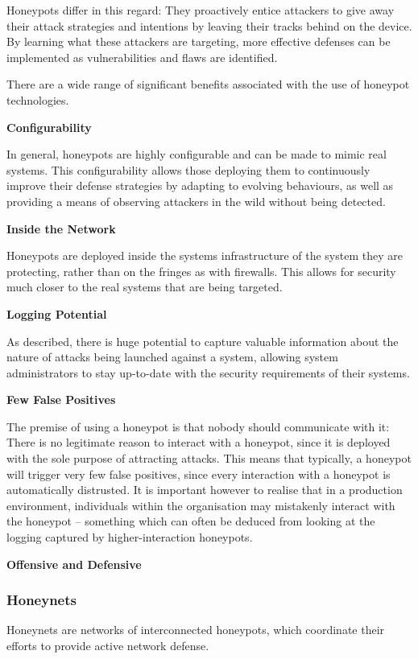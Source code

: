 Honeypots differ in this regard: They proactively entice attackers to give away their attack strategies and intentions by leaving their tracks behind on the device. By learning what these attackers are targeting, more effective defenses can be implemented as vulnerabilities and flaws are identified.

There are a wide range of significant benefits associated with the use of honeypot technologies. 

\bullet \textbf{Configurability}

In general, honeypots are highly configurable and can be made to mimic real systems. This configurability allows those deploying them to continuously improve their defense strategies by adapting to evolving behaviours, as well as providing a means of observing attackers in the wild without being detected.

\bullet \textbf{Inside the Network} 

Honeypots are deployed inside the systems infrastructure of the system they are protecting, rather than on the fringes as with firewalls. This allows for security much closer to the real systems that are being targeted. 

\bullet \textbf{Logging Potential} 

As described, there is huge potential to capture valuable information about the nature of attacks being launched against a system, allowing system administrators to stay up-to-date with the security requirements of their systems.

\bullet \textbf{Few False Positives}

The premise of using a honeypot is that nobody should communicate with it: There is no legitimate reason to interact with a honeypot, since it is deployed with the sole purpose of attracting attacks. This means that typically, a honeypot will trigger very few false positives, since every interaction with a honeypot is automatically distrusted. It is important however to realise that in a production environment, individuals within the organisation may mistakenly interact with the honeypot – something which can often be deduced from looking at the logging captured by higher-interaction honeypots. 

\bullet \textbf{Offensive and Defensive}



\subsubsection{Honeynets}
Honeynets are networks of interconnected honeypots, which coordinate their efforts to provide active network defense.

